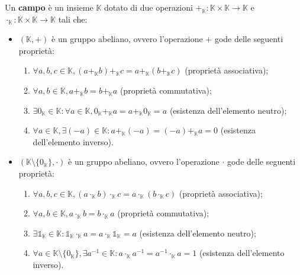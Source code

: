 \begin{definition}[Campo]
    \label{def:campo}
    Un \textbf{campo} è un insieme $\mathbb{K}$ dotato di due operazioni $+_\mathbb{K}: \mathbb{K} \times \mathbb{K} \to \mathbb{K}$ e $\cdot_\mathbb{K}: \mathbb{K} \times \mathbb{K} \to \mathbb{K}$ tali che:
    \begin{itemize}
        \item $(\mathbb{K}, +)$ è un gruppo abeliano, ovvero l'operazione $+$ gode delle seguenti proprietà:
        \begin{enumerate}[label=\protect\circled{\arabic*}]
            \item $\forall a, b, c \in \mathbb{K}, (a +_\mathbb{K} b) +_\mathbb{K} c = a +_\mathbb{K} (b +_\mathbb{K} c)$ (proprietà associativa);
            \item $\forall a, b \in \mathbb{K}, a +_\mathbb{K} b = b +_\mathbb{K} a$ (proprietà commutativa);
            \item $\exists 0_\mathbb{K} \in \mathbb{K} : \forall a \in \mathbb{K}, 0_\mathbb{K} +_\mathbb{K} a = a +_\mathbb{K} 0_\mathbb{K} = a$ (esistenza dell'elemento neutro);
            \item $\forall a \in \mathbb{K}, \exists (-a) \in \mathbb{K} : a +_\mathbb{K} (-a) = (-a) +_\mathbb{K} a = 0$ (esistenza dell'elemento inverso).
        \end{enumerate}
        \item $(\mathbb{K} \setminus \{ 0_\mathbb{K} \}, \cdot)$ è un gruppo abeliano, ovvero l'operazione $\cdot$ gode delle seguenti proprietà:
        \begin{enumerate}[label=\protect\circled{\arabic*}]
            \item $\forall a, b, c \in \mathbb{K}, (a \cdot_\mathbb{K} b) \cdot_\mathbb{K} c = a \cdot_\mathbb{K} (b \cdot_\mathbb{K} c)$ (proprietà associativa);
            \item $\forall a, b \in \mathbb{K}, a \cdot_\mathbb{K} b = b \cdot_\mathbb{K} a$ (proprietà commutativa);
            \item $\exists \mathds{1}_{\mathbb{K}} \in \mathbb{K} : \mathds{1}_{\mathbb{K}} \cdot_\mathbb{K} a = a \cdot_\mathbb{K} \mathds{1}_{\mathbb{K}} = a$ (esistenza dell'elemento neutro);
            \item $\forall a \in \mathbb{K} \setminus \{ 0_\mathbb{K} \}, \exists a^{-1} \in \mathbb{K} : a \cdot_\mathbb{K} a^{-1} = a^{-1} \cdot_\mathbb{K} a = 1$ (esistenza dell'elemento inverso).
        \end{enumerate}
    \end{itemize}
\end{definition}

